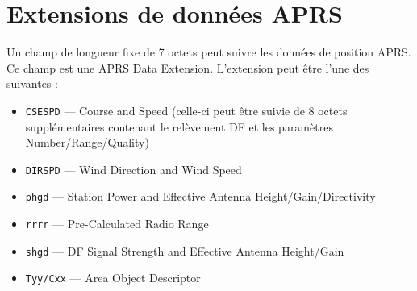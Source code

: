 \chapter[EXTENSIONS DE DONNÉES APRS]{Extensions de données
APRS}\label{extensions-de-donnuxe9es-aprs}

\newcommand{\chsevenblanktripletslash}{%
  \begingroup
  \setlength{\fboxsep}{1pt}%
  \colorbox{APRSMarkerYellow}{\strut{\chsevenspacesymbolfont ⎵⎵⎵/⎵⎵⎵}}%
  \endgroup
}
\newcommand{\chsevendircell}[2]{%
  \parbox[c][7.0ex][c]{28pt}{\centering #1\\[0.25ex]#2}%
}
\newcommand{\chsevengraycell}{\cellcolor{gray!20}}
\newcommand{\chsevengrayrow}{\rowcolor{gray!20}}

\begin{aprsbodyblock}
Un champ de longueur fixe de 7 octets peut suivre les données de
position APRS. Ce champ est une APRS Data Extension. L'extension peut
être l'une des suivantes :

\begin{itemize}
\tightlist
\item
  \texttt{CSE}\lit{/}\texttt{SPD} --- Course and Speed (celle-ci peut être suivie de
  8 octets supplémentaires contenant le relèvement DF et les paramètres
  Number/Range/Quality)
\item
  \texttt{DIR}\lit{/}\texttt{SPD} --- Wind Direction and Wind Speed
\item
  \texttt{phgd} --- Station Power and Effective Antenna
  Height/Gain/Directivity
\item
  \texttt{rrrr} --- Pre-Calculated Radio Range
\item
  \texttt{shgd} --- DF Signal Strength and Effective Antenna
  Height/Gain
\item
  \texttt{Tyy/Cxx} --- Area Object Descriptor
\end{itemize}
\end{aprsbodyblock}

